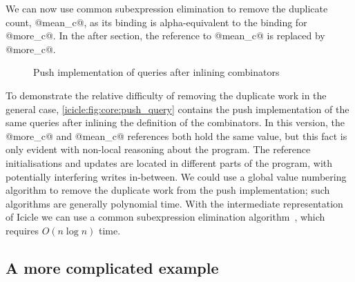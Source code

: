 We can now use common subexpression elimination to remove the duplicate count, @mean_c@, as its binding is alpha-equivalent to the binding for @more_c@.
In the after section, the reference to @mean_c@ is replaced by @more_c@.

\begin{figure}
\caption{Push implementation of queries after inlining combinators}
\label{icicle:fig:core:push_query}
\end{figure}

To demonstrate the relative difficulty of removing the duplicate work in the general case, \autoref{icicle:fig:core:push_query} contains the push implementation of the same queries after inlining the definition of the combinators.
In this version, the @more_c@ and @mean_c@ references both hold the same value, but this fact is only evident with non-local reasoning about the program.
The reference initialisations and updates are located in different parts of the program, with potentially interfering writes in-between.
We could use a global value numbering~\citep{gulwani2004polynomial} algorithm to remove the duplicate work from the push implementation; such algorithms are generally polynomial time.
With the intermediate representation of Icicle we can use a common subexpression elimination algorithm~\cite{chitil1997common}, which requires $O(n \log n)$ time.

\subsection{A more complicated example}

